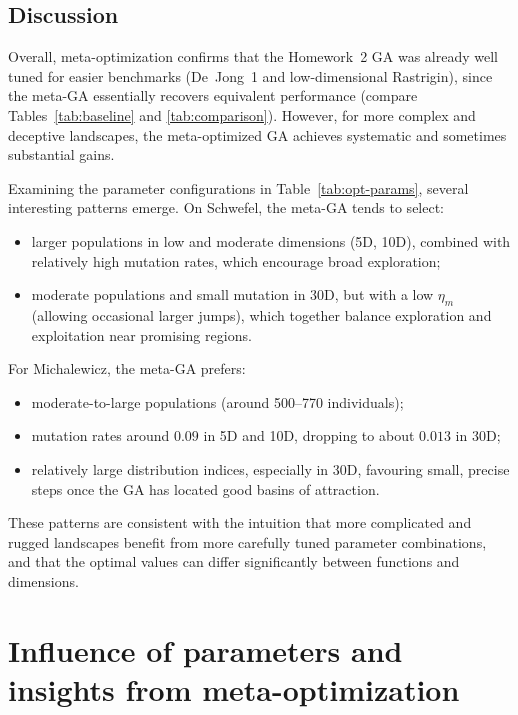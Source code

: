 \documentclass[11pt]{article}
\begin{document}
\subsection{Discussion}

Overall, meta-optimization confirms that the Homework~2 GA was already
well tuned for easier benchmarks (De~Jong~1 and low-dimensional Rastrigin),
since the meta-GA essentially recovers equivalent performance
(compare Tables~\ref{tab:baseline} and \ref{tab:comparison}).
However, for more complex and deceptive landscapes, the meta-optimized GA
achieves systematic and sometimes substantial gains.

Examining the parameter configurations in Table~\ref{tab:opt-params},
several interesting patterns emerge.
On Schwefel, the meta-GA tends to select:
\begin{itemize}
  \item larger populations in low and moderate dimensions (5D, 10D),
        combined with relatively high mutation rates, which encourage
        broad exploration;
  \item moderate populations and small mutation in 30D, but with a
        low $\eta_m$ (allowing occasional larger jumps), which together
        balance exploration and exploitation near promising regions.
\end{itemize}

For Michalewicz, the meta-GA prefers:
\begin{itemize}
  \item moderate-to-large populations (around 500--770 individuals);
  \item mutation rates around $0.09$ in 5D and 10D, dropping to
        about $0.013$ in 30D;
  \item relatively large distribution indices, especially in 30D,
        favouring small, precise steps once the GA has located good
        basins of attraction.
\end{itemize}

These patterns are consistent with the intuition that more complicated and
rugged landscapes benefit from more carefully tuned parameter combinations,
and that the optimal values can differ significantly between functions and
dimensions.

\section{Influence of parameters and insights from meta-optimization}
\end{document}
